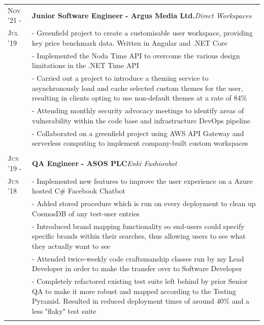 \documentclass[a4paper,10pt]{extarticle} %
\begin{document}
{\begin{tabularx}{\linewidth}{ l | X }
\textsc{Nov '21 -} & \textbf{Junior Software Engineer} \textbf{ - Argus Media Ltd.}\hfill\textit{Direct Workspaces}\\
\textsc{Jul '19}& {- Greenfield project to create a customisable user workspace, providing key price benchmark data. Written in Angular and .NET Core }\\
& {- Implemented the Noda Time API to overcome the various design limitations in the .NET Time API}\\
& {- Carried out a project to introduce a theming service to asynchronously load and cache selected custom themes for the user, resulting in clients opting to use non-default themes at a rate of 84\%}\\
& {- Attending monthly security advocacy meetings to identify areas of vulnerability within the code base and infrastructure DevOps pipeline}\\
& {- Collaborated on a greenfield project using AWS API Gateway and serverless computing to implement company-built custom workspaces}\\
\multicolumn{1}{c}{} \\


\textsc{Jun '19 -} & \textbf{QA Engineer} \textbf{ - ASOS PLC}\hfill\textit{Enki Fashionbot}\\
\textsc{Jun '18}& {- Implemented new features to improve the user experience on a Azure hosted C\# Facebook Chatbot }\\
& {- Added stored procedure which is run on every deployment to clean up CosmosDB of any test-user entries}\\
& {- Introduced brand mapping functionality so end-users could specify specific brands within their searches, thus allowing users to see what they actually want to see}\\
& {- Attended twice-weekly code craftsmanship classes run by my Lead Developer in order to make the transfer over to Software Developer}\\
& {- Completely refactored existing test suite left behind by prior Senior QA to make it more robust and mapped according to the Testing Pyramid. Resulted in reduced deployment times of around 40\% and a less "flaky" test suite}\\
\multicolumn{1}{c}{} \\



\end{tabularx}}
\end{document}
